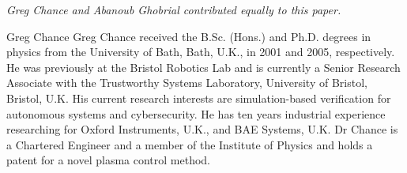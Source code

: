 \documentclass[letterpaper, 10 pt, journal, twoside]{IEEEtran}
\begin{document}

\textit{Greg Chance and Abanoub Ghobrial contributed equally to this paper.}


\printbibliography

\begin{IEEEbiography}{Greg Chance}
Greg Chance received the B.Sc. (Hons.) and Ph.D. degrees in physics from the University of Bath, Bath, U.K., in 2001 and 2005, respectively. He was previously at the Bristol Robotics Lab and is currently a Senior Research Associate with the Trustworthy Systems Laboratory, University of Bristol, Bristol, U.K. His current research interests are simulation-based verification for autonomous systems and cybersecurity. He has ten years industrial experience researching for Oxford Instruments, U.K., and BAE Systems, U.K. Dr Chance is a Chartered Engineer and a member of the Institute of Physics and holds a patent for a novel plasma control method. 
\end{IEEEbiography}
\end{document}
